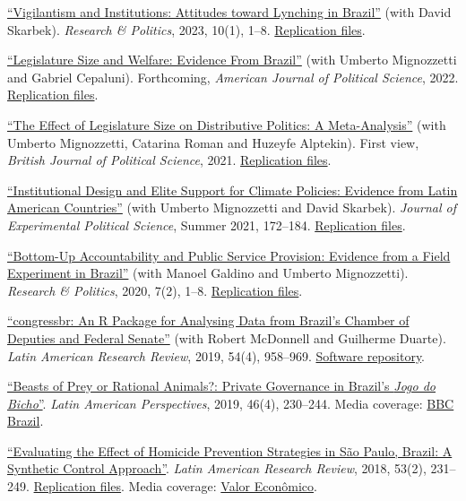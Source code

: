 \documentclass[a4paper]{article}
\renewenvironment{itemize}{
	\begin{list}{}{
			\setlength{\leftmargin}{1.5em}
		}
		}{
	\end{list}
}
\begin{document}
\begin{itemize}
\item \href{https://doi.org/10.1177/20531680221150389}{``Vigilantism and Institutions: Attitudes toward Lynching in Brazil''} (with David Skarbek). \textit{Research \& Politics}, 2023, 10(1), 1--8. \href{https://github.com/danilofreire/lynching-experiment-brazil}{Replication files}.
\item \href{https://github.com/umbertomig/legislature-size-welfare}{``Legislature Size and Welfare: Evidence From Brazil''} (with Umberto Mignozzetti and Gabriel Cepaluni). Forthcoming, \textit{American Journal of Political Science}, 2022. \href{https://github.com/umbertomig/legislature-size-welfare}{Replication files}.
\item \href{https://doi.org/10.1017/S0007123422000552}{``The Effect of Legislature Size on Distributive Politics: A Meta-Analysis''} (with Umberto Mignozzetti, Catarina Roman and Huzeyfe Alptekin). First view, \textit{British Journal of Political Science}, 2021. \href{https://github.com/danilofreire/legislature-size-meta-analysis}{Replication files}.
\item \href{http://dx.doi.org/10.1017/XPS.2020.19}{``Institutional Design and Elite Support for Climate Policies: Evidence from Latin American Countries''} (with Umberto Mignozzetti and David Skarbek). \textit{Journal of Experimental Political Science}, Summer 2021, 172--184. \href{https://doi.org/10.7910/DVN/VTA5OA}{Replication files}.
\item \href{https://doi.org/10.1177%2F2053168020914444}{``Bottom-Up Accountability and Public Service Provision: Evidence from a Field Experiment in Brazil''} (with Manoel Galdino and Umberto Mignozzetti). \textit{Research \& Politics}, 2020, 7(2), 1--8. \href{https://github.com/umbertomig/tdp-accountability}{Replication files}.
\item \href{https://doi.org/10.25222/larr.447}{``congressbr: An R Package for Analysing Data from Brazil's Chamber of Deputies and Federal Senate''} (with Robert McDonnell and Guilherme Duarte). \textit{Latin American Research Review}, 2019, 54(4), 958--969. \href{https://github.com/duarteguilherme/congressbr}{Software repository}.
\item \href{https://doi.org/10.1177/0094582X19846519}{``Beasts of Prey or Rational Animals?: Private Governance in Brazil's \emph{Jogo do Bicho}''}. \textit{Latin American Perspectives}, 2019, 46(4), 230--244. Media coverage: \href{http://www.bbc.com/portuguese/brasil-40140693}{BBC Brazil}.
\item \href{https://doi.org/10.25222/larr.334}{``Evaluating the Effect of Homicide Prevention Strategies in São Paulo, Brazil: A Synthetic Control Approach''}. \textit{Latin American Research Review}, 2018, 53(2), 231--249. \href{https://github.com/danilofreire/homicides-sp-synth}{Replication files}. Media coverage: \href{http://www.valor.com.br/cultura/5111524/sangue-no-asfalto}{Valor Econômico}.

\end{itemize}
\end{document}
